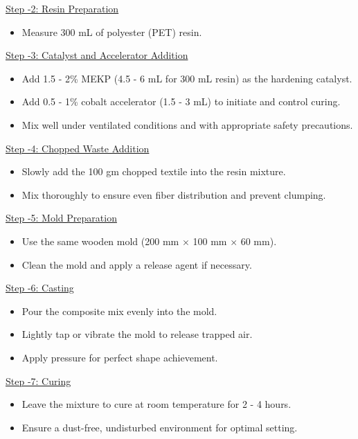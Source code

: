 \noindent\underline{Step -2: Resin Preparation}
\begin{itemize}[leftmargin=1.5cm]
    \item Measure 300 mL of polyester (PET) resin.
\end{itemize}

\noindent\underline{Step -3: Catalyst and Accelerator Addition }
\begin{itemize}[leftmargin=1.5cm]
    \item Add 1.5 - 2\% MEKP (4.5 - 6 mL for 300 mL resin) as the hardening catalyst.
    \item Add 0.5 - 1\% cobalt accelerator (1.5 - 3 mL) to initiate and control curing.
    \item Mix well under ventilated conditions and with appropriate safety precautions.
\end{itemize}

\noindent\underline{Step -4: Chopped Waste Addition }
\begin{itemize}
    \item Slowly add the 100 gm chopped textile into the resin mixture.
    \item Mix thoroughly to ensure even fiber distribution and prevent clumping.
\end{itemize}

\noindent\underline{Step -5: Mold Preparation }
\begin{itemize}[leftmargin=1.5cm]
    \item Use the same wooden mold (200 mm $\times$ 100 mm $\times$ 60 mm).
    \item Clean the mold and apply a release agent if necessary.
\end{itemize}

\noindent\underline{Step -6: Casting}
\begin{itemize}[leftmargin=1.5cm]
    \item Pour the composite mix evenly into the mold.
    \item Lightly tap or vibrate the mold to release trapped air.
    \item Apply pressure for perfect shape achievement.
\end{itemize}

\noindent\underline{Step -7: Curing }
\begin{itemize}[leftmargin=1.5cm]
    \item Leave the mixture to cure at room temperature for 2 - 4 hours.
    \item Ensure a dust-free, undisturbed environment for optimal setting.
\end{itemize}

